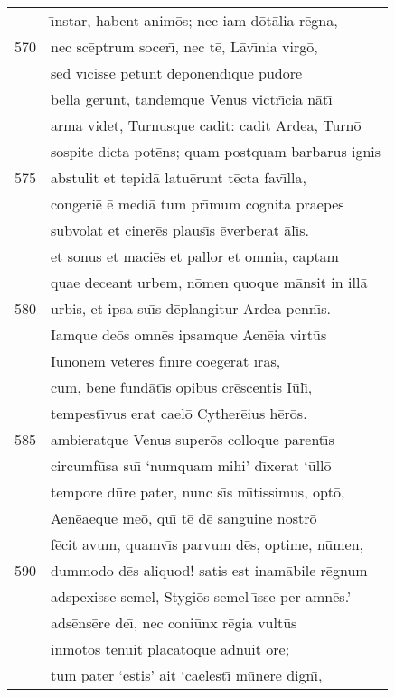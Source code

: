 \documentclass[paper=6in:9in,pagesize=pdftex,
               headinclude=on,footinclude=on,12pt]{scrbook}
\begin{document}
\begin{longtable}[p]{ r l }
 & \={\i}nstar, habent anim\=os; nec iam d\=ot\=alia r\=egna,\\ 
570 & nec sc\=eptrum socer\={\i}, nec t\=e, L\=av\={\i}nia virg\=o,\\ 
 & sed v\={\i}cisse petunt d\=ep\=onend\={\i}que pud\=ore\\ 
 & bella gerunt, tandemque Venus victr\={\i}cia n\=at\={\i}\\ 
 & arma videt, Turnusque cadit: cadit Ardea, Turn\=o\\ 
 & sospite dicta pot\=ens; quam postquam barbarus ignis\\ 
575 & abstulit et tepid\=a latu\=erunt t\=ecta fav\={\i}lla,\\ 
 & congeri\=e \=e medi\=a tum pr\={\i}mum cognita praepes\\ 
 & subvolat et ciner\=es plaus\={\i}s \=everberat \=al\={\i}s.\\ 
 & et sonus et maci\=es et pallor et omnia, captam\\ 
 & quae deceant urbem, n\=omen quoque m\=ansit in ill\=a\\ 
580 & urbis, et ipsa su\={\i}s d\=eplangitur Ardea penn\={\i}s.\\ 
 & \indent Iamque de\=os omn\=es ipsamque Aen\=eia virt\=us\\ 
 & I\=un\=onem veter\=es f\={\i}n\={\i}re co\=egerat \={\i}r\=as,\\ 
 & cum, bene fund\=at\={\i}s opibus cr\=escentis I\=ul\={\i},\\ 
 & tempest\={\i}vus erat cael\=o Cyther\=eius h\=er\=os.\\ 
585 & ambieratque Venus super\=os colloque parent\={\i}s\\ 
 & circumf\=usa su\={\i} `numquam mihi' d\={\i}xerat `\=ull\=o\\ 
 & tempore d\=ure pater, nunc s\={\i}s m\={\i}tissimus, opt\=o,\\ 
 & Aen\=eaeque me\=o, qu\={\i} t\=e d\=e sanguine nostr\=o\\ 
 & f\=ecit avum, quamv\={\i}s parvum d\=es, optime, n\=umen,\\ 
590 & dummodo d\=es aliquod! satis est inam\=abile r\=egnum\\ 
 & adspexisse semel, Stygi\=os semel \={\i}sse per amn\=es.'\\ 
 & ads\=ens\=ere de\={\i}, nec coni\=unx r\=egia vult\=us\\ 
 & inm\=ot\=os tenuit pl\=ac\=at\=oque adnuit \=ore;\\ 
 & tum pater `estis' ait `caelest\={\i} m\=unere dign\={\i},\\ 

\end{longtable}
\end{document}
